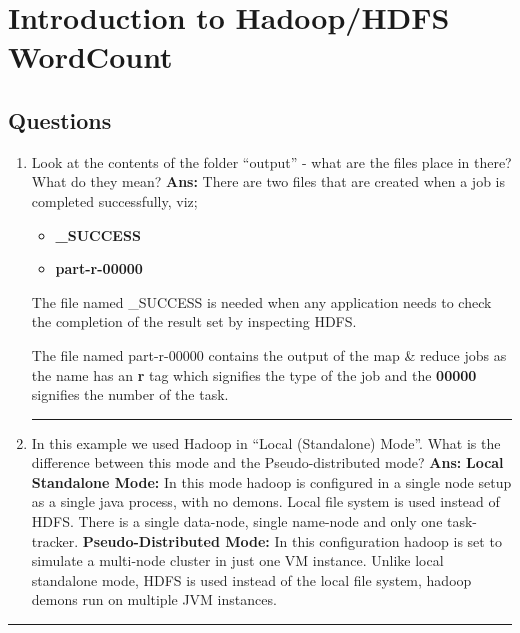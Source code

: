 \documentclass[12pt]{article}
\begin{document}
\section{Introduction to Hadoop/HDFS WordCount}
\subsection{Questions}
\begin{enumerate}
\item Look at the contents of the folder “output” - what are the files place in there? What do they mean?
\newline
\newline
\textbf{Ans:}
\newline
	There are two files that are created when a job is completed successfully, viz;
    \begin{itemize}
    \item \textbf{\_SUCCESS}
    \item \textbf{part-r-00000}
    \end{itemize}
	The file named \_SUCCESS is needed when any application needs to check the completion of the result set by inspecting HDFS.
    
    The file named part-r-00000 contains the output of the map \& reduce jobs as the name has an \textbf{r} tag which signifies the type of the job and the \textbf{00000} signifies the number of the task. \cite{FIH}
\newline
\hrule
\item In this example we used Hadoop in “Local (Standalone) Mode”. What is the difference between this mode and the Pseudo-distributed mode?
\newline
\newline
\textbf{Ans:}
\newline
	\textbf{Local Standalone Mode:}
    \newline
    	In this mode hadoop is configured in a single node setup as a single java process, with no demons. Local file system is used instead of HDFS. There is a single data-node, single name-node and only one task-tracker.
    \newline
    \newline
    \textbf{Pseudo-Distributed Mode:}
    \newline
    	In this configuration hadoop is set to simulate a multi-node cluster in just one VM instance. Unlike local standalone mode, HDFS is used instead of the local file system, hadoop demons run on multiple JVM instances. \cite{MsIH}
\end{enumerate}
\hrule
\end{document}
